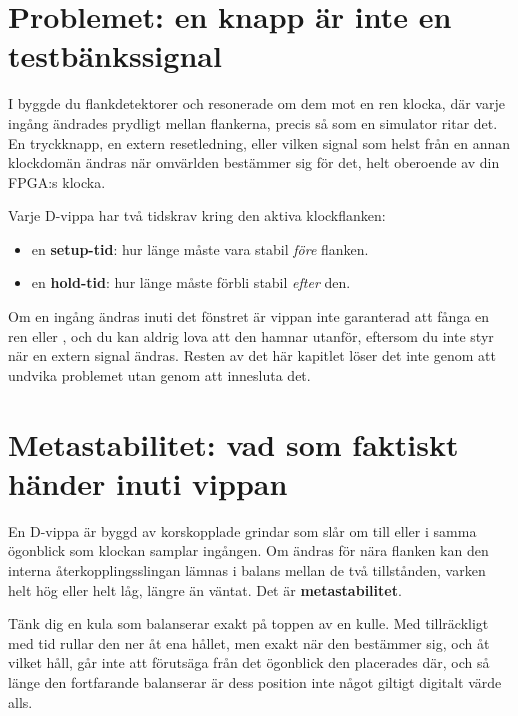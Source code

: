 
\section{Problemet: en knapp är inte en testbänkssignal}
\label{c4:sec:problem}

I  byggde du flankdetektorer och resonerade om dem mot en ren klocka, där varje
ingång ändrades prydligt mellan flankerna, precis så som en simulator ritar det. En tryckknapp, en
extern resetledning, eller vilken signal som helst från en annan klockdomän ändras när omvärlden
bestämmer sig för det, helt oberoende av din FPGA:s klocka.

Varje D-vippa har två tidskrav kring den aktiva klockflanken:
\begin{itemize}
  \item en \textbf{setup-tid}: hur länge  måste vara stabil \emph{före} flanken.
  \item en \textbf{hold-tid}: hur länge  måste förbli stabil \emph{efter} den.
\end{itemize}

Om en ingång ändras inuti det fönstret är vippan inte garanterad att fånga en ren  eller
, och du kan aldrig lova att den hamnar utanför, eftersom du inte styr när en extern
signal ändras. Resten av det här kapitlet löser det inte genom att undvika problemet utan genom
att innesluta det.

\section{Metastabilitet: vad som faktiskt händer inuti vippan}
\label{c4:sec:meta}

En D-vippa är byggd av korskopplade grindar som slår om till  eller  i samma
ögonblick som klockan samplar ingången. Om  ändras för nära flanken kan den interna
återkopplingsslingan lämnas i balans mellan de två tillstånden, varken helt hög eller helt låg,
längre än väntat. Det är \textbf{metastabilitet}.

Tänk dig en kula som balanserar exakt på toppen av en kulle. Med tillräckligt med tid rullar den
ner åt ena hållet, men exakt när den bestämmer sig, och åt vilket håll, går inte att förutsäga från
det ögonblick den placerades där, och så länge den fortfarande balanserar är dess position inte
något giltigt digitalt värde alls.

